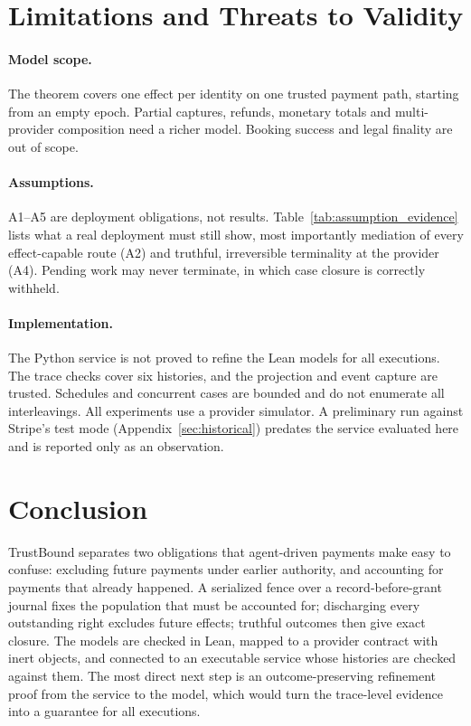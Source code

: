 \documentclass[runningheads]{llncs}
\begin{document}
\section{Limitations and Threats to Validity}
\label{sec:limitations}
\paragraph{Model scope.} The theorem covers one effect per identity on one
trusted payment path, starting from an empty epoch. Partial captures, refunds,
monetary totals and multi-provider composition need a richer model. Booking
success and legal finality are out of scope.
\paragraph{Assumptions.} A1--A5 are deployment obligations, not results.
Table~\ref{tab:assumption_evidence} lists what a real deployment must still
show, most importantly mediation of every effect-capable route (A2) and
truthful, irreversible terminality at the provider (A4). Pending work may never
terminate, in which case closure is correctly withheld.
\paragraph{Implementation.} The Python service is not proved to refine the Lean
models for all executions. The trace checks cover six histories, and the
projection and event capture are trusted. Schedules and concurrent cases are
bounded and do not enumerate all interleavings. All experiments use a provider
simulator. A preliminary run against Stripe's test mode
(Appendix~\ref{sec:historical}) predates the service evaluated here and is
reported only as an observation.

\section{Conclusion}
\label{sec:conclusion}
TrustBound separates two obligations that agent-driven payments make easy to
confuse: excluding future payments under earlier authority, and accounting for
payments that already happened. A serialized fence over a record-before-grant
journal fixes the population that must be accounted for; discharging every
outstanding right excludes future effects; truthful outcomes then give exact
closure. The models are checked in Lean, mapped to a provider contract with
inert objects, and connected to an executable service whose histories are
checked against them. The most direct next step is an outcome-preserving
refinement proof from the service to the model, which would turn the
trace-level evidence into a guarantee for all executions.
\end{document}
